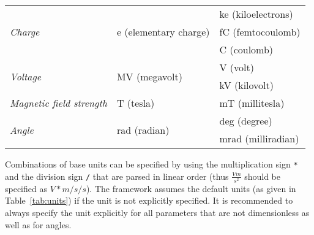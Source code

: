 \begin{table}[tbp]
\begin{tabular}{lll}
\midrule
\multirow{3}{*}{\textit{Charge}}  & \multirow{3}{*}{e (elementary charge)}  & ke (kiloelectrons)       \\
                                  &                                         & fC (femtocoulomb)        \\
                                  &                                         & C (coulomb)              \\
\midrule
\multirow{2}{*}{\textit{Voltage}} & \multirow{2}{*}{MV (megavolt)}          & V (volt)                 \\
                                  &                                         & kV (kilovolt)            \\
\midrule
\textit{Magnetic field strength}  & T (tesla)                               & mT (millitesla)                 \\
\midrule
\multirow{2}{*}{\textit{Angle}}   & \multirow{2}{*}{rad (radian)}           & deg (degree)             \\
                                  &                                         & mrad (milliradian)       \\
\bottomrule
\end{tabular}
\end{table}

Combinations of base units can be specified by using the multiplication sign \texttt{*} and the division sign \texttt{/} that are parsed in linear order (thus $\frac{V m}{s^2}$ should be specified as $V*m/s/s$).
The framework assumes the default units (as given in Table~\ref{tab:units}) if the unit is not explicitly specified.
It is recommended to always specify the unit explicitly for all parameters that are not dimensionless as well as for angles.

